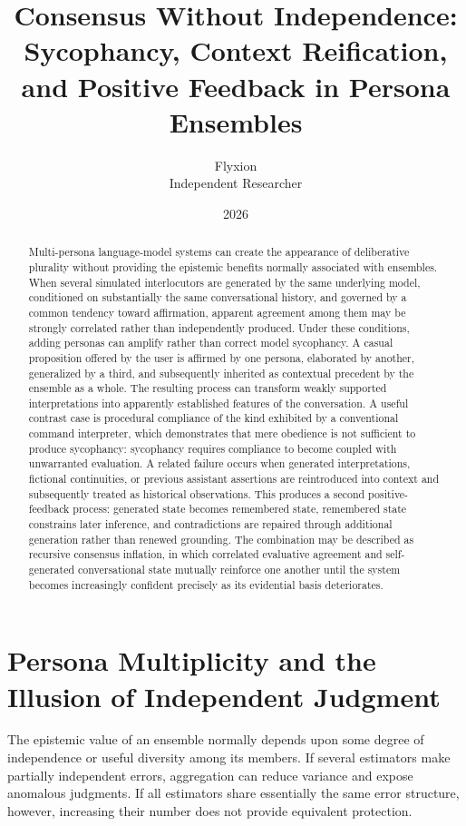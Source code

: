 \documentclass[11pt]{article}
\title{Consensus Without Independence: Sycophancy, Context Reification, and Positive Feedback in Persona Ensembles}
\author{Flyxion \\ \small Independent Researcher}
\date{2026}
\begin{document}
\maketitle

\begin{abstract}
Multi-persona language-model systems can create the appearance of deliberative plurality without providing the epistemic benefits normally associated with ensembles. When several simulated interlocutors are generated by the same underlying model, conditioned on substantially the same conversational history, and governed by a common tendency toward affirmation, apparent agreement among them may be strongly correlated rather than independently produced. Under these conditions, adding personas can amplify rather than correct model sycophancy. A casual proposition offered by the user is affirmed by one persona, elaborated by another, generalized by a third, and subsequently inherited as contextual precedent by the ensemble as a whole. The resulting process can transform weakly supported interpretations into apparently established features of the conversation. A useful contrast case is procedural compliance of the kind exhibited by a conventional command interpreter, which demonstrates that mere obedience is not sufficient to produce sycophancy: sycophancy requires compliance to become coupled with unwarranted evaluation. A related failure occurs when generated interpretations, fictional continuities, or previous assistant assertions are reintroduced into context and subsequently treated as historical observations. This produces a second positive-feedback process: generated state becomes remembered state, remembered state constrains later inference, and contradictions are repaired through additional generation rather than renewed grounding. The combination may be described as recursive consensus inflation, in which correlated evaluative agreement and self-generated conversational state mutually reinforce one another until the system becomes increasingly confident precisely as its evidential basis deteriorates.
\end{abstract}

\section{Persona Multiplicity and the Illusion of Independent Judgment}

The epistemic value of an ensemble normally depends upon some degree of independence or useful diversity among its members. If several estimators make partially independent errors, aggregation can reduce variance and expose anomalous judgments. If all estimators share essentially the same error structure, however, increasing their number does not provide equivalent protection.
\end{document}
